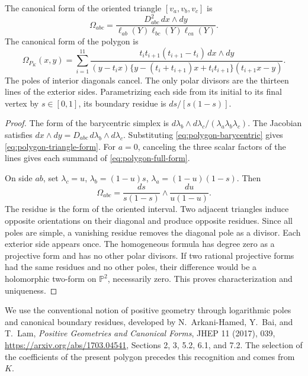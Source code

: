\begin{theorem}
\label{thm:polygon-form}
The canonical form of the oriented triangle \([v_a,v_b,v_c]\) is
\begin{equation}
 \Omega_{abc}=
 \frac{D_{abc}^2\,dx\wedge dy}
 {\ell_{ab}(Y)\ell_{bc}(Y)\ell_{ca}(Y)}.
 \label{eq:polygon-triangle-form}
\end{equation}
The canonical form of the polygon is
\begin{equation}
 \boxed{\displaystyle
 \Omega_{P_K}(x,y)=
 \sum_{i=1}^{11}
 \frac{t_it_{i+1}(t_{i+1}-t_i)\,dx\wedge dy}
 {(y-t_ix)\{y-(t_i+t_{i+1})x+t_it_{i+1}\}(t_{i+1}x-y)}.}
 \label{eq:polygon-full-form}
\end{equation}
The poles of interior diagonals cancel. The only polar divisors are
the thirteen lines of the exterior sides. Parametrizing each side
from its initial to its final vertex by \(s\in[0,1]\), its boundary
residue is \(ds/[s(1-s)]\).
\end{theorem}
\begin{proof}
The form of the barycentric simplex is
\(d\lambda_b\wedge d\lambda_c/(\lambda_a\lambda_b\lambda_c)\).
The Jacobian satisfies
\(dx\wedge dy=D_{abc}\,d\lambda_b\wedge d\lambda_c\).
Substituting \eqref{eq:polygon-barycentric} gives
\eqref{eq:polygon-triangle-form}. For \(a=0\), canceling the three
scalar factors of the lines gives each summand of
\eqref{eq:polygon-full-form}.

On side \(ab\), set \(\lambda_c=u\),
\(\lambda_b=(1-u)s\), \(\lambda_a=(1-u)(1-s)\). Then
\[
 \Omega_{abc}=\frac{ds}{s(1-s)}\wedge\frac{du}{u(1-u)}.
\]
The residue is the form of the oriented interval. Two adjacent
triangles induce opposite orientations on their diagonal and produce
opposite residues. Since all poles are simple, a vanishing residue
removes the diagonal pole as a divisor. Each exterior side appears
once. The homogeneous formula has degree zero as a projective form
and has no other polar divisors. If two rational projective forms
had the same residues and no other poles, their difference would be
a holomorphic two-form on \(\mathbb P^2\), necessarily zero.
This proves characterization and uniqueness.
\end{proof}

We use the conventional notion of positive geometry through logarithmic
poles and canonical boundary residues, developed by
N.~Arkani-Hamed, Y.~Bai, and T.~Lam, \emph{Positive Geometries and Canonical
Forms}, JHEP 11 (2017), 039,
\url{https://arxiv.org/abs/1703.04541}, Sections 2, 3, 5.2, 6.1, and 7.2.
The selection of the coefficients of the present polygon precedes this
recognition and comes from \(K\).

